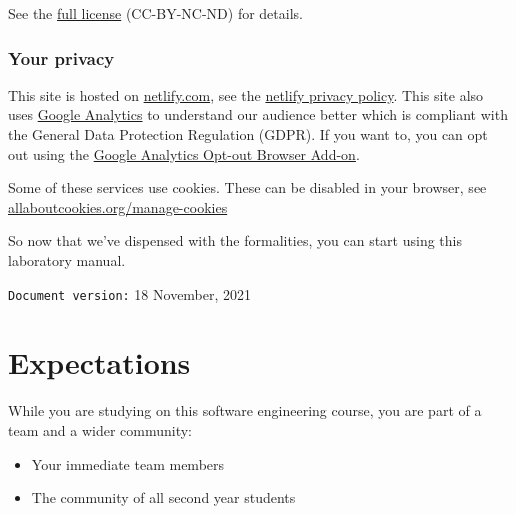 \documentclass[
]{book}
\providecommand{\tightlist}{%
  \setlength{\itemsep}{0pt}\setlength{\parskip}{0pt}}
\begin{document}
See the \href{https://creativecommons.org/licenses/by-nc-nd/3.0/}{full license} (CC-BY-NC-ND) for details.

\hypertarget{privacy}{%
\subsection{Your privacy}\label{privacy}}

This site is hosted on \href{https://www.netlify.com/}{netlify.com}, see the \href{https://www.netlify.com/privacy/}{netlify privacy policy}. This site also uses \href{https://en.wikipedia.org/wiki/Google_Analytics}{Google Analytics} to understand our audience better which is compliant with the General Data Protection Regulation (GDPR). If you want to, you can opt out using the \href{https://tools.google.com/dlpage/gaoptout/}{Google Analytics Opt-out Browser Add-on}.

Some of these services use cookies. These can be disabled in your browser, see \href{https://www.allaboutcookies.org/manage-cookies/}{allaboutcookies.org/manage-cookies}

So now that we've dispensed with the formalities, you can start using this laboratory manual.





































\texttt{Document\ version:} 18 November, 2021

\hypertarget{expectations}{%
\chapter*{Expectations}\label{expectations}}

While you are studying on this software engineering course, you are part of a team and a wider community:

\begin{itemize}
\tightlist
\item
  Your immediate team members
\item
  The community of all second year students
\end{itemize}
\end{document}

